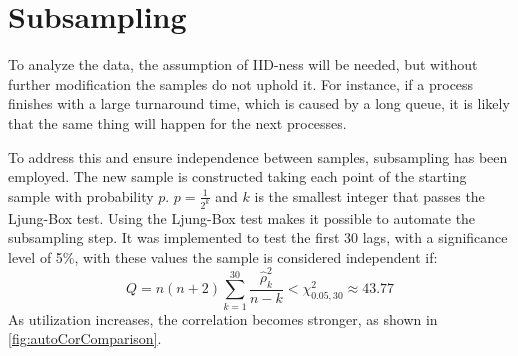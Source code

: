 

\section{Subsampling}

To analyze the data, the assumption of IID-ness will be needed, but without further modification the samples do not uphold it.
For instance, if a process finishes with a large turnaround time, which is caused by a long queue, it is likely that the same thing will happen for the next processes.

To address this and ensure independence between samples, subsampling has been employed. The new sample is constructed taking each point of the starting sample with probability $p$.
$p = \frac{1}{2^k}$ and $k$ is the smallest integer that passes the Ljung-Box test.
Using the Ljung-Box test makes it possible to automate the subsampling step. It was implemented to test the first 30 lags, with a significance level of 5\%, with these values the sample is considered independent if:
\vspace{-0.5\baselineskip}
\begin{equation}
    Q = n(n+2) \sum_{k=1}^{30} \frac{\hat{\rho}_k^2}{n-k} < \chi^2_{0.05,30} \approx 43.77
\end{equation}
As utilization increases, the correlation becomes stronger, as shown in \cref{fig:autoCorComparison}.

